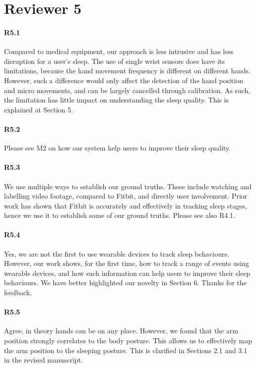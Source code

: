 \section*{Reviewer 5}

\paragraph{R5.1} Compared to medical equipment, our approach is less intrusive and has less disruption for a user's sleep. The use of
single wrist sensors does have its limitations, because the hand movement frequency is different on different hands. However, such a
difference would only affect the detection of the hand position and micro movements, and can be largely cancelled through calibration. As
such, the limitation has little impact on understanding the sleep quality. This is explained at Section 5.


\paragraph{R5.2} Please see M2 on how our system help users to improve their sleep quality.

\paragraph{R5.3} We use multiple ways to establish our ground truths. These include watching and labelling video footage, compared to
Fitbit, and directly user involvement. Prior work has shown that Fitbit is accurately and effectively in tracking sleep stages, hence we use it to
establish some of our ground truths. Please see also R4.1.

\paragraph{R5.4} Yes, we are not the first to use wearable devices to track sleep behaviours. However, our work shows, for the first time, how
 to track a range of events using wearable devices, and how such information can help users to improve
their sleep behaviours. We have better highlighted our novelty in Section 6. Thanks for the feedback.

\paragraph{R5.5} Agree, in theory hands can be on any place. However, we found that the arm position strongly correlates to the body
posture. This allows us to effectively map the arm position to the sleeping posture. This is clarified in Sections 2.1 and 3.1 in the
revised manuscript.

